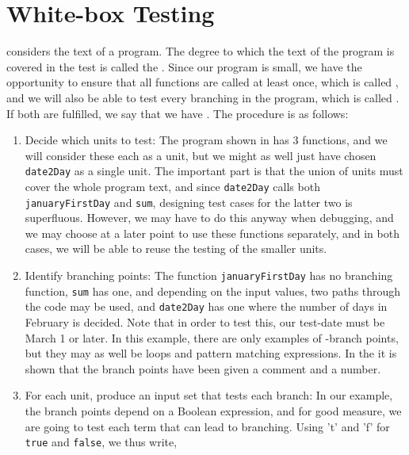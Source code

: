 \section{White-box Testing}
 considers the text of a program. The degree to which the text of the program is covered in the test is called the . Since our program is small, we have the opportunity to ensure that all functions are called at least once, which is called , and we will also be able to test every branching in the program, which is called . If both are fulfilled, we say that we have . The procedure is as follows:
\begin{enumerate}
\item Decide which units to test: The program shown in  has 3 functions, and we will consider these each as a unit, but we might as well just have chosen \lstinline!date2Day! as a single unit. The important part is that the union of units must cover the whole program text, and since \lstinline!date2Day! calls both \lstinline!januaryFirstDay! and \lstinline!sum!, designing test cases for the latter two is superfluous. However, we may have to do this anyway when debugging, and we may choose at a later point to use these functions separately, and in both cases, we will be able to reuse the testing of the smaller units.
\item Identify branching points: The function \lstinline!januaryFirstDay! has no branching function, \lstinline!sum! has one, and depending on the input values, two paths through the code may be used, and \lstinline!date2Day! has one where the number of days in February is decided. Note that in order to test this, our test-date must be March 1 or later. In this example, there are only examples of -branch points, but they may as well be loops and pattern matching expressions. In the  it is shown that the branch points have been given a comment and a number.
 \item For each unit, produce an input set that tests each branch: In our example, the branch points depend on a Boolean expression, and for good measure, we are going to test each term that can lead to branching. Using 't' and 'f' for \lstinline{true} and \lstinline{false}, we thus write,
   \begin{center}

\end{center}
\end{enumerate}
